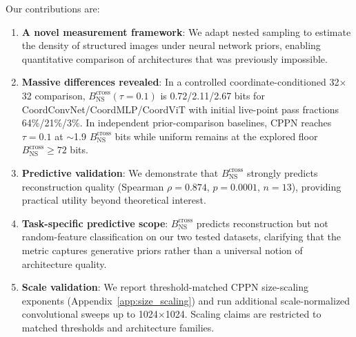 \documentclass{article}
\begin{document}
Our contributions are:
\begin{enumerate}
    \item \textbf{A novel measurement framework}: We adapt nested sampling to estimate the density of structured images under neural network priors, enabling quantitative comparison of architectures that was previously impossible.

    \item \textbf{Massive differences revealed}: In a controlled coordinate-conditioned 32$\times$32 comparison, $B_{\text{NS}}^{\text{cross}}(\tau{=}0.1)$ is 0.72/2.11/2.67 bits for CoordConvNet/CoordMLP/CoordViT with initial live-point pass fractions 64\%/21\%/3\%. In independent prior-comparison baselines, CPPN reaches $\tau=0.1$ at $\sim$1.9 $B_{\text{NS}}^{\text{cross}}$ bits while uniform remains at the explored floor $B_{\text{NS}}^{\text{cross}} \ge 72$ bits.

    \item \textbf{Predictive validation}: We demonstrate that $B_{\text{NS}}^{\text{cross}}$ strongly predicts reconstruction quality (Spearman $\rho=0.874$, $p=0.0001$, $n=13$), providing practical utility beyond theoretical interest.

    \item \textbf{Task-specific predictive scope}: $B_{\text{NS}}^{\text{cross}}$ predicts reconstruction but not random-feature classification on our two tested datasets, clarifying that the metric captures generative priors rather than a universal notion of architecture quality.

    \item \textbf{Scale validation}: We report threshold-matched CPPN size-scaling exponents (Appendix~\ref{app:size_scaling}) and run additional scale-normalized convolutional sweeps up to 1024$\times$1024. Scaling claims are restricted to matched thresholds and architecture families.
\end{enumerate}
\end{document}
